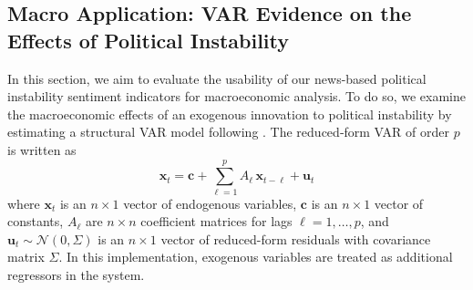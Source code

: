 \documentclass[12pt,a4paper,fleqn]{article}
\begin{document}


\subsection{Macro Application: VAR Evidence on the Effects of Political Instability}\label{sec:maro_application}



In this section, we aim to evaluate the usability of our news-based political instability sentiment indicators for macroeconomic analysis. To do so, we examine the macroeconomic effects of an exogenous innovation to political instability by estimating a structural VAR model following \cite{caldara2022}. The reduced‐form VAR of order \(p\) is written as 
\begin{equation}
\mathbf{x}_t = \mathbf{c} + \sum_{\ell=1}^p A_\ell\,\mathbf{x}_{t-\ell} + \mathbf{u}_t
\end{equation}
where $\mathbf{x}_t$ is an $n \times 1$ vector of endogenous variables, $\mathbf{c}$ is an $n \times 1$ vector of constants, $A_\ell$ are $n \times n$ coefficient matrices for lags $\ell = 1, \ldots, p$, and $\mathbf{u}_t \sim \mathcal{N}(0, \Sigma)$ is an $n \times 1$ vector of reduced-form residuals with covariance matrix $\Sigma$. In this implementation, exogenous variables are treated as additional regressors in the system. 
\end{document}
